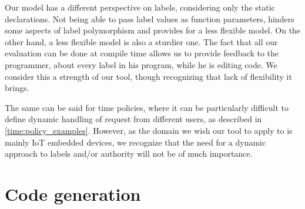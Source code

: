 Our model has a different perspective on labels, considering only the static declarations.
Not being able to pass label values as function parameters, hinders some aspects of label polymorphism and provides for a less flexible model.
On the other hand, a less flexible model is also a sturdier one.
The fact that all our evaluation can be done at compile time allows us to provide feedback to the programmer, about every label in his program, while he is editing code.
We consider this a strength of our tool, though recognizing that lack of flexibility it brings.

The same can be said for time policies, where it can be particularly difficult to define dynamic handling of request from different users, as described in \cref{time:policy_examples}.
However, as the domain we wish our tool to apply to is mainly IoT embedded devices, we recognize that the need for a dynamic approach to labels and/or authority will not be of much importance.

\section{Code generation}

